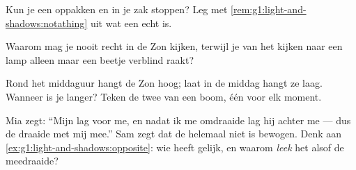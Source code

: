 \begin{exercise}[$\star$]\label{exo:g1:light-and-shadows:6}
Kun je een  oppakken en in je zak stoppen? Leg met
\cref{rem:g1:light-and-shadows:notathing} uit wat een  echt is.
\end{exercise}

\begin{exercise}[$\star$]\label{exo:g1:light-and-shadows:7}
Waarom mag je nooit recht in de Zon kijken, terwijl je van het kijken
naar een lamp alleen maar een beetje verblind raakt?
\end{exercise}

\begin{exercise}[$\star$]\label{exo:g1:light-and-shadows:8}
Rond het middaguur hangt de Zon hoog; laat in de middag hangt ze
laag. Wanneer is je  langer? Teken de twee  van een
boom, één voor elk moment.
\end{exercise}

\begin{exercise}[$\star\star$]\label{exo:g1:light-and-shadows:9}
Mia zegt: ``Mijn  lag voor me, en nadat ik me omdraaide lag hij
achter me --- dus de  draaide met mij mee.'' Sam zegt dat de
 helemaal niet is bewogen. Denk aan
\cref{ex:g1:light-and-shadows:opposite}: wie heeft gelijk, en waarom
\emph{leek} het alsof de  meedraaide?
\end{exercise}
